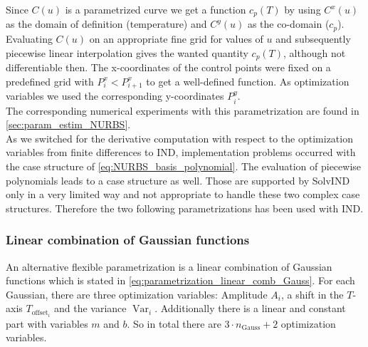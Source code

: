 \documentclass{scrartcl}[12pt, halfparskip]
\numberwithin{equation}{section}
\numberwithin{figure}{section}
\numberwithin{table}{section}
\newcommand{\var}{\operatorname{Var}}
\begin{document}
Since $C(u)$ is a parametrized curve we get a function $c_p(T)$ by using $C^x(u)$ as the domain of definition (temperature) and $C^y(u)$ as the co-domain ($c_p$). Evaluating $C(u)$ on an appropriate fine grid for values of $u$ and subsequently piecewise linear interpolation gives the wanted quantity $c_p(T)$, although not differentiable then.
The x-coordinates of the control points were fixed on a predefined grid with $P_i^x < P_{i+1}^x$ to get a well-defined function.
As optimization variables we used the corresponding y-coordinates $P_i^y$. \\
The corresponding numerical experiments with this parametrization are found in \cref{sec:param_estim_NURBS}. \\

As we switched for the derivative computation with respect to the optimization variables from finite differences to IND, implementation problems occurred with the case structure of \cref{eq:NURBS_basis_polynomial}. The evaluation of piecewise polynomials leads to a case structure as well. Those are supported by SolvIND only in a very limited way and not appropriate to handle these two complex case structures. Therefore the two following parametrizations has been used with IND.


\subsubsection{Linear combination of Gaussian functions}
\label{sec:parametrization_Gausse}


An alternative flexible parametrization is a linear combination of Gaussian functions which is stated in \cref{eq:parametrization_linear_comb_Gauss}. For each Gaussian, there are three optimization variables: Amplitude $A_i$, a shift in the $T$-axis $T_{\text{offset}_i}$ and the variance $\var_i$. Additionally there is a linear and constant part with variables $m$ and $b$. So in total there are $3 \cdot n_{\text{Gauss}} + 2$ optimization variables. 
\end{document}

